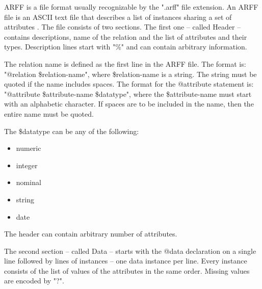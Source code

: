 ARFF is a file format usually recognizable by the ".arff" file extension. 
An ARFF file is an ASCII text file that describes a list of instances sharing a set of attributes \cite{arff}. The file consists of two sections. The first one -- called Header -- contains descriptions, name of the relation and the list of attributes and their types. Description lines start with "\%" and can contain arbitrary information. 

The relation name is defined as the first line in the ARFF file. The format is: 
"@relation \$relation-name",
where \$relation-name is a string. The string must be quoted if the name includes spaces. 
The format for the @attribute statement is:
"@attribute \$attribute-name \$datatype",
where the \$attribute-name must start with an alphabetic character. If spaces are to be included in the name, then the entire name must be quoted.

The \$datatype can be any of the following:
\begin{itemize}
	\item numeric
	\item integer
	\item nominal
	\item string
	\item date
\end{itemize}
The header can contain arbitrary number of attributes.

The second section -- called Data --  starts with the @data declaration on a single line followed by lines of instances -- one data instance per line. Every instance consists of the list of values of the attributes in the same order. Missing values are encoded by "?".

